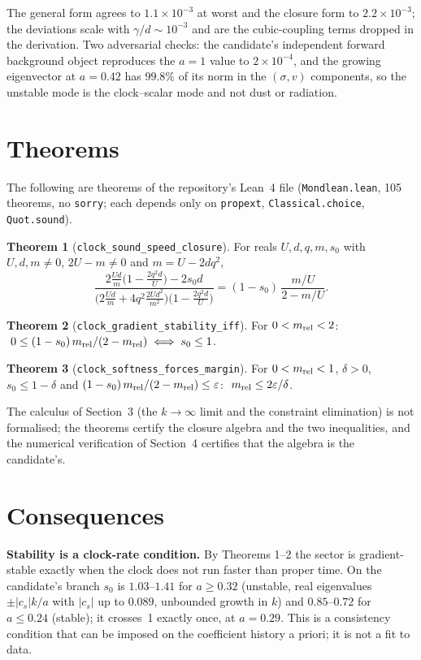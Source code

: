 \documentclass[11pt,letterpaper]{article}
\begin{document}
The general form agrees to $1.1\times10^{-3}$ at worst and the closure form to $2.2\times10^{-3}$; the deviations scale with $\gamma/d\sim10^{-3}$ and are the cubic-coupling terms dropped in the derivation. Two adversarial checks: the candidate's independent forward background object reproduces the $a=1$ value to $2\times10^{-4}$, and the growing eigenvector at $a=0.42$ has $99.8\%$ of its norm in the $(\sigma,v)$ components, so the unstable mode is the clock--scalar mode and not dust or radiation.

\section{Theorems}
The following are theorems of the repository's Lean~4 file (\texttt{Mondlean.lean}, 105 theorems, no \texttt{sorry}; each depends only on \texttt{propext}, \texttt{Classical.choice}, \texttt{Quot.sound}).

\textbf{Theorem 1} (\texttt{clock\_sound\_speed\_closure}). For reals $U,d,q,m,s_0$ with $U,d,m\neq0$, $2U-m\neq0$ and $m=U-2dq^2$,
\[
\frac{2\frac{Ud}{m}\big(1-\frac{2q^2d}{U}\big)-2s_0d}{\big(2\frac{Ud}{m}+4q^2\frac{2Ud^2}{m^2}\big)\big(1-\frac{2q^2d}{U}\big)}=(1-s_0)\,\frac{m/U}{2-m/U}.
\]

\textbf{Theorem 2} (\texttt{clock\_gradient\_stability\_iff}). For $0<m_{\rm rel}<2$: $\;0\le(1-s_0)\,m_{\rm rel}/(2-m_{\rm rel})\iff s_0\le1$.

\textbf{Theorem 3} (\texttt{clock\_softness\_forces\_margin}). For $0<m_{\rm rel}<1$, $\delta>0$, $s_0\le1-\delta$ and $(1-s_0)\,m_{\rm rel}/(2-m_{\rm rel})\le\varepsilon$: $\;m_{\rm rel}\le2\varepsilon/\delta$.

The calculus of Section~3 (the $k\to\infty$ limit and the constraint elimination) is not formalised; the theorems certify the closure algebra and the two inequalities, and the numerical verification of Section~4 certifies that the algebra is the candidate's.

\section{Consequences}
\textbf{Stability is a clock-rate condition.} By Theorems 1--2 the sector is gradient-stable exactly when the clock does not run faster than proper time. On the candidate's branch $s_0$ is $1.03$--$1.41$ for $a\ge0.32$ (unstable, real eigenvalues $\pm|c_s|k/a$ with $|c_s|$ up to $0.089$, unbounded growth in $k$) and $0.85$--$0.72$ for $a\le0.24$ (stable); it crosses~1 exactly once, at $a=0.29$. This is a consistency condition that can be imposed on the coefficient history a priori; it is not a fit to data.
\end{document}
